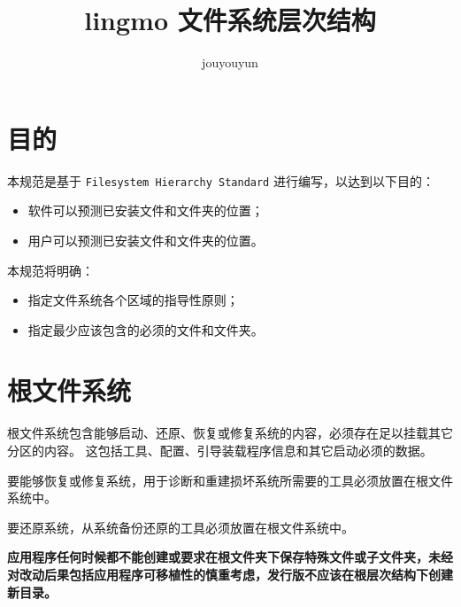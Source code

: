 \documentclass{utart}
\title{lingmo 文件系统层次结构}
\author{jouyouyun}
\begin{document}
\utMakeTOC

\section{目的}
本规范是基于 \texttt{Filesystem Hierarchy Standard}\cite{FHS} 进行编写，以达到以下目的：
\begin{itemize}[leftmargin=4em]
\item 软件可以预测已安装文件和文件夹的位置；
\item 用户可以预测已安装文件和文件夹的位置。
\end{itemize}

本规范将明确：
\begin{itemize}[leftmargin=4em]
\item 指定文件系统各个区域的指导性原则；
\item 指定最少应该包含的必须的文件和文件夹。
\end{itemize}

\section{根文件系统}
根文件系统包含能够启动、还原、恢复或修复系统的内容，必须存在足以挂载其它分区的内容。
这包括工具、配置、引导装载程序信息和其它启动必须的数据。

要能够恢复或修复系统，用于诊断和重建损坏系统所需要的工具必须放置在根文件系统中。

要还原系统，从系统备份还原的工具必须放置在根文件系统中。

\textbf{应用程序任何时候都不能创建或要求在根文件夹下保存特殊文件或子文件夹，未经对改动后果包括应用程序可移植性的慎重考虑，发行版不应该在根层次结构下创建新目录。}
\end{document}
